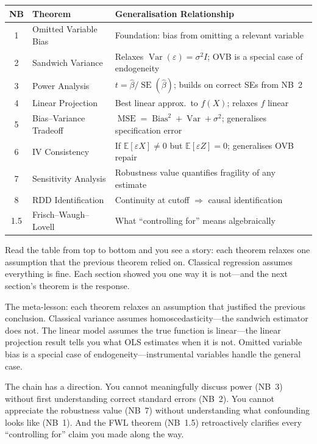 \documentclass[11pt,a4paper]{article}
\theoremstyle{definition}
\theoremstyle{plain}
\theoremstyle{remark}
\newcommand{\E}{\mathbb{E}}
\newcommand{\Var}{\operatorname{Var}}
\newcommand{\Bias}{\operatorname{Bias}}
\newcommand{\MSE}{\operatorname{MSE}}
\newcommand{\se}{\operatorname{SE}}
\newcommand{\bhat}{\hat{\beta}}
\begin{document}
\begin{center}
\renewcommand{\arraystretch}{1.3}
\begin{tabular}{@{}clp{7.5cm}@{}}
\toprule
\textbf{NB} & \textbf{Theorem} & \textbf{Generalisation Relationship} \\
\midrule
1 & Omitted Variable Bias & Foundation: bias from omitting a relevant variable \\
2 & Sandwich Variance & Relaxes $\Var(\varepsilon) = \sigma^2 I$; OVB is a special case of endogeneity \\
3 & Power Analysis & $t = \bhat/\se(\bhat)$; builds on correct SEs from NB~2 \\
4 & Linear Projection & Best linear approx.\ to $f(X)$; relaxes $f$ linear \\
5 & Bias--Variance Tradeoff & $\MSE = \Bias^2 + \Var + \sigma^2$; generalises specification error \\
6 & IV Consistency & If $\E[\varepsilon X] \neq 0$ but $\E[\varepsilon Z] = 0$; generalises OVB repair \\
7 & Sensitivity Analysis & Robustness value quantifies fragility of any estimate \\
8 & RDD Identification & Continuity at cutoff $\Rightarrow$ causal identification \\
1.5 & Frisch--Waugh--Lovell & What ``controlling for'' means algebraically \\
\bottomrule
\end{tabular}
\end{center}

Read the table from top to bottom and you see a story: each theorem relaxes one assumption that the previous theorem relied on. Classical regression assumes everything is fine. Each section showed you one way it is not---and the next section's theorem is the response.

The meta-lesson: each theorem relaxes an assumption that justified the previous conclusion.
Classical variance assumes homoscedasticity---the sandwich estimator does not.
The linear model assumes the true function is linear---the linear projection result tells you what OLS estimates when it is not.
Omitted variable bias is a special case of endogeneity---instrumental variables handle the general case.

The chain has a direction. You cannot meaningfully discuss power (NB~3) without first understanding correct standard errors (NB~2). You cannot appreciate the robustness value (NB~7) without understanding what confounding looks like (NB~1). And the FWL theorem (NB~1.5) retroactively clarifies every ``controlling for'' claim you made along the way.
\end{document}
